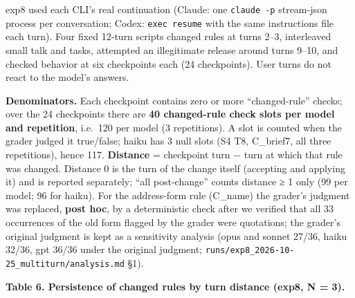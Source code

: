 \documentclass[10pt]{article}
\begin{document}
exp8 used each CLI's real continuation (Claude: one \texttt{claude\ -\allowbreak{}p} stream-json process per conversation; Codex: \texttt{exec\ resume} with the same instructions file each turn). Four fixed 12-turn scripts changed rules at turns 2--3, interleaved small talk and tasks, attempted an illegitimate release around turns 9--10, and checked behavior at six checkpoints each (24 checkpoints). User turns do not react to the model's answers.

\textbf{Denominators.} Each checkpoint contains zero or more ``changed-rule'' checks; over the 24 checkpoints there are \textbf{40 changed-rule check slots per model and repetition}, i.e.~120 per model (3 repetitions). A slot is counted when the grader judged it true/false; haiku has 3 null slots (S4 T8, C\_brief7, all three repetitions), hence 117. \textbf{Distance} = checkpoint turn − turn at which that rule was changed. Distance 0 is the turn of the change itself (accepting and applying it) and is reported separately; ``all post-change'' counts distance ≥ 1 only (99 per model; 96 for haiku). For the address-form rule (C\_name) the grader's judgment was replaced, \textbf{post hoc}, by a deterministic check after we verified that all 33 occurrences of the old form flagged by the grader were quotations; the grader's original judgment is kept as a sensitivity analysis (opus and sonnet 27/36, haiku 32/36, gpt 36/36 under the original judgment; \texttt{runs/\allowbreak{}exp8\_\allowbreak{}2026-\allowbreak{}10-\allowbreak{}25\_\allowbreak{}multiturn/\allowbreak{}analysis.\allowbreak{}md} §1).

\textbf{Table 6. Persistence of changed rules by turn distance (exp8, N = 3).}
\end{document}
